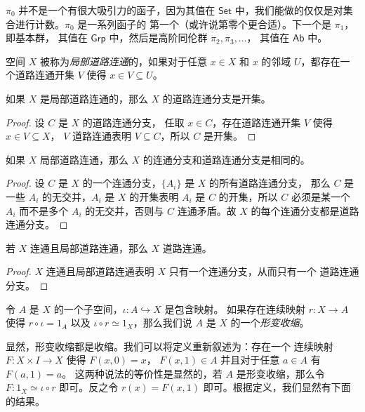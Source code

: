 \documentclass[fontset=none]{Notes}
\newcommand{\cat}[1]{\mathsf{#1}}
\begin{document}
$\pi_0$ 并不是一个有很大吸引力的函子，因为其值在 $\cat{Set}$
中，我们能做的仅仅是对集合进行计数。$\pi_0$ 是一系列函子的
第一个（或许说第零个更合适）。下一个是 $\pi_1$，即基本群，
其值在 $\cat{Grp}$ 中，然后是高阶同伦群 $\pi_2,\pi_3,\dots$，
其值在 $\cat{Ab}$ 中。

\begin{definition}
  空间 $X$ 被称为\emph{局部道路连通}的，如果对于任意 $x\in X$
  和 $x$ 的邻域 $U$，都存在一个道路连通开集 $V$ 使得 $x\in V\subseteq U$。
\end{definition}

\begin{theorem}
  如果 $X$ 是局部道路连通的，那么 $X$
  的道路连通分支是开集。
\end{theorem}
\begin{proof}
  设 $C$ 是 $X$ 的道路连通分支，
  任取 $x\in C$，存在道路连通开集 $V$ 使得 $x\in V\subseteq X$，
  $V$ 道路连通表明 $V\subseteq C$，所以 $C$ 是开集。
\end{proof}

\begin{corollary}
  如果 $X$ 局部道路连通，那么 $X$ 的连通分支和道路连通分支是相同的。
\end{corollary}
\begin{proof}
  设 $C$ 是 $X$ 的一个连通分支，$\{A_i\}$ 是 $X$ 的所有道路连通分支，
  那么 $C$ 是一些 $A_i$ 的无交并，$A_i$ 是 $X$ 的开集表明 $A_i$
  是 $C$ 的开集，所以 $C$ 必须是某一个 $A_i$ 而不是多个 $A_i$
  的无交并，否则与 $C$ 连通矛盾。故 $X$ 的每个连通分支都是道路连通分支。
\end{proof}

\begin{corollary}
  若 $X$ 连通且局部道路连通，那么 $X$ 道路连通。
\end{corollary}
\begin{proof}
  $X$ 连通且局部道路连通表明 $X$ 只有一个连通分支，从而只有一个
  道路连通分支。
\end{proof}

\begin{definition}
  令 $A$ 是 $X$ 的一个子空间，$\iota:A\hookrightarrow X$ 是包含映射。
  如果存在连续映射 $r:X\to A$ 使得 $r\circ \iota=1_A$
  以及 $\iota\circ r\simeq 1_X$，那么我们说 $A$ 是 $X$
  的一个\emph{形变收缩}。
\end{definition}

显然，形变收缩都是收缩。我们可以将定义重新叙述为：存在一个
连续映射 $F:X\times I\to X$ 使得 $F(x,0)=x$，
$F(x,1)\in A$ 并且对于任意 $a\in A$ 有 $F(a,1)=a$。
这两种说法的等价性是显然的，若 $A$ 是形变收缩，那么令
$F:1_X\simeq \iota\circ r$ 即可。反之令 $r(x)=F(x,1)$
即可。根据定义，我们显然有下面的结果。
\end{document}
